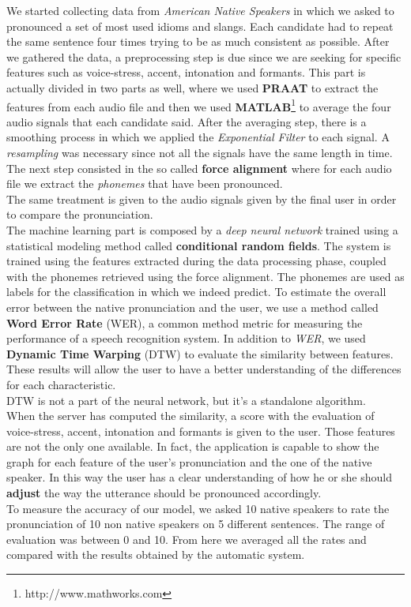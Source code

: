 \noindent We started collecting data from \textit{American Native Speakers} in which we asked to pronounced a set of most used idioms and slangs. Each candidate had to repeat the same sentence four times trying to be as much consistent as possible. After we gathered the data, a preprocessing step is due since we are seeking for specific features such as voice-stress, accent, intonation and formants. This part is actually divided in two parts as well, where we used \textbf{PRAAT}\cite{boersma2010p} to extract the features from each audio file and then we used \textbf{MATLAB}\footnote{http://www.mathworks.com} to average the four audio signals that each candidate said. After the averaging step, there is a smoothing process in which we applied the \textit{Exponential Filter} to each signal. A \textit{resampling} was necessary since not all the signals have the same length in time. The next step consisted in the so called \textbf{force alignment} where for each audio file we extract the \textit{phonemes} that have been pronounced. \\
\noindent The same treatment is given to the audio signals given by the final user in order to compare the pronunciation. \\

\noindent The machine learning part is composed by a \textit{deep neural network} trained using a statistical modeling method called \textbf{conditional random fields}. The system is trained using the features extracted during the data processing phase, coupled with the phonemes retrieved using the force alignment. The phonemes are used as labels for the classification in which we indeed predict. To estimate the overall error between the native pronunciation and the user, we use a method called \textbf{Word Error Rate} (WER), a common method metric for measuring the performance of a speech recognition system. In addition to \textit{WER}, we used \textbf{Dynamic Time Warping} (DTW) to evaluate the similarity between features. These results will allow the user to have a better understanding of the differences for each characteristic. \\
\noindent DTW is not a part of the neural network, but it's a standalone algorithm. \\

\noindent When the server has computed the similarity, a score with the evaluation of voice-stress, accent, intonation and formants is given to the user. Those features are not the only one available. In fact, the application is capable to show the graph for each feature of the user's pronunciation and the one of the native speaker. In this way the user has a clear understanding of how he or she should \textbf{adjust} the way the utterance should be pronounced accordingly. \\

\noindent To measure the accuracy of our model, we asked 10 native speakers to rate the pronunciation of 10 non native speakers on 5 different sentences. The range of evaluation was between 0 and 10. From here we averaged all the rates and compared with the results obtained by the automatic system.
